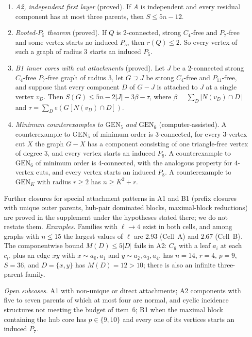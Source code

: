 \documentclass[11pt]{amsart}
\theoremstyle{definition}
\theoremstyle{remark}
\newcommand{\lr}{\ell}
\newcommand{\pp}{p}
\newcommand{\GEN}{\mathrm{GEN}}
\begin{document}
\begin{enumerate}
\item \emph{A2, independent first layer} (proved). If $A$ is independent and every residual component has at most three parents, then $S\le5n-12$.
\item \emph{Rooted-$P_5$ theorem} (proved). If $Q$ is $2$-connected, strong $C_4$-free and $P_7$-free and some vertex starts no induced $P_5$, then $r(Q)\le2$. So every vertex of such a graph of radius $3$ starts an induced $P_5$.
\item \emph{B1 inner cores with cut attachments} (proved). Let $J$ be a $2$-connected strong $C_4$-free $P_7$-free graph of radius $3$, let $G\supseteq J$ be strong $C_4$-free and $P_{11}$-free, and suppose that every component $D$ of $G-J$ is attached to $J$ at a single vertex $v_D$. Then $S(G)\le5n-2|J|-3\beta-\tau$, where $\beta=\sum_D|N(v_D)\cap D|$ and $\tau=\sum_De(G[N(v_D)\cap D])$.
\item \emph{Minimum counterexamples to $\GEN_5$ and $\GEN_6$} (computer-assisted). A counterexample to $\GEN_5$ of minimum order is $3$-connected, for every $3$-vertex cut $X$ the graph $G-X$ has a component consisting of one triangle-free vertex of degree $3$, and every vertex starts an induced $P_9$. A counterexample to $\GEN_6$ of minimum order is $4$-connected, with the analogous property for $4$-vertex cuts, and every vertex starts an induced $P_8$. A counterexample to $\GEN_K$ with radius $r\ge2$ has $n\ge K^2+r$.
\end{enumerate}
Further closures for special attachment patterns in A1 and B1 (prefix closures with unique outer parents, hub-pair dominated blocks, maximal-block reductions) are proved in the supplement under the hypotheses stated there; we do not restate them. \emph{Examples.} Families with $\lr\to4$ exist in both cells, and among graphs with $n\le15$ the largest values of $\lr$ are $2.93$ (Cell~A) and $2.67$ (Cell~B). The componentwise bound $M(D)\le5|D|$ fails in A2: $C_6$ with a leaf $a_i$ at each $c_i$, plus an edge $xy$ with $x\sim a_0,a_1$ and $y\sim a_2,a_3,a_4$, has $n=14$, $r=4$, $\pp=9$, $S=36$, and $D=\{x,y\}$ has $M(D)=12>10$; there is also an infinite three-parent family.

\emph{Open subcases.} A1 with non-unique or direct attachments; A2 components with five to seven parents of which at most four are normal, and cyclic incidence structures not meeting the budget of item~6; B1 when the maximal block containing the hub core has $\pp\in\{9,10\}$ and every one of its vertices starts an induced $P_7$.
\end{document}
